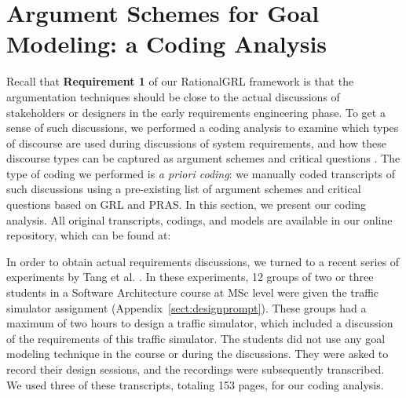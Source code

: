 \section{Argument Schemes for Goal Modeling: a Coding Analysis}
\label{sect:gmas}

Recall that \textbf{Requirement 1} of our RationalGRL framework is that the argumentation techniques should be close to the actual discussions of stakeholders or designers in the early requirements engineering phase. To get a sense of such discussions, we performed a coding analysis to examine which types of discourse are used during discussions of system requirements, and how these discourse types can be captured as argument schemes and critical questions \cite{saldana2015coding}. The type of coding we performed is \emph{a priori coding}: we manually coded transcripts of such discussions using a pre-existing list of argument schemes and critical questions based on GRL and PRAS. In this section, we present our coding analysis. All original transcripts, codings, and models are available in our online repository, which can be found at:  
 
\begin{quote}
\rationalgrlurl{}
\end{quote}

In order to obtain actual requirements discussions, we turned to a recent series of experiments by Tang et al. \cite{TangEtal2018}. In these experiments, 12 groups of two or three students in a Software Architecture course at MSc level were given the traffic simulator assignment (Appendix~\ref{sect:designprompt}). These groups had a maximum of two hours to design a traffic simulator, which included a discussion of the requirements of this traffic simulator. The students did not use any goal modeling technique in the course or during the discussions. They were asked to record their design sessions, and the recordings were subsequently transcribed. We used three of these transcripts, totaling 153 pages, for our coding analysis. 


